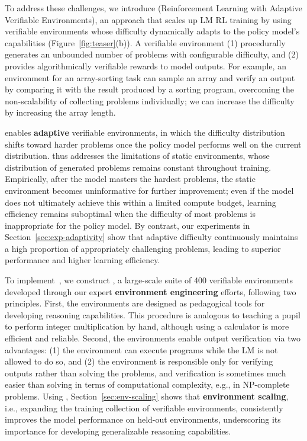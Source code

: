 \documentclass{article}
\theoremstyle{plain}
\theoremstyle{definition}
\theoremstyle{remark}
\begin{document}
To address these challenges, we introduce \textbf{\ours{}} (Reinforcement Learning with Adaptive Verifiable Environments), an approach that scales up LM RL training by using verifiable environments whose difficulty dynamically adapts to the policy model’s capabilities
(Figure~\ref{fig:teaser}(b)).
A verifiable environment (1) procedurally generates an unbounded number of problems with configurable difficulty, and (2) provides algorithmically verifiable rewards to model outputs.
For example, an environment for an array-sorting task can sample an array and verify an output by comparing it with the result produced by a sorting program, overcoming the non-scalability of collecting problems individually;
we can increase the difficulty by increasing the array length.

\ours{} enables \textbf{adaptive} verifiable environments, in which the difficulty distribution shifts toward harder problems once the policy model performs well on the current distribution.
\ours{} thus addresses the limitations of static environments, whose distribution of generated problems remains constant throughout training.
Empirically, after the model masters the hardest problems, the static environment becomes uninformative for further improvement;
even if the model does not ultimately achieve this within a limited compute budget, learning efficiency remains suboptimal when the difficulty of most problems is inappropriate for the policy model.
By contrast, our experiments in Section~\ref{sec:exp-adaptivity} show that adaptive difficulty continuously maintains a high proportion of appropriately challenging problems, leading to superior performance and higher learning efficiency.

To implement~\ours{}, we construct \textbf{\suite{}}, a large-scale suite of 400 verifiable environments developed through our expert \textbf{environment engineering} efforts, following two principles.
First, the environments are designed as pedagogical tools for developing reasoning capabilities.
This procedure is analogous to teaching a pupil to perform integer multiplication by hand, although using a calculator is more efficient and reliable.
Second, the environments enable output verification via two advantages:
(1) the environment can execute programs while the LM is not allowed to do so,
and (2) the environment is responsible only for verifying outputs rather than solving the problems, and verification is sometimes much easier than solving in terms of computational complexity, e.g., in NP-complete problems.
Using \suite{}, Section~\ref{sec:env-scaling} shows that \textbf{environment scaling}, i.e., expanding the training collection of verifiable environments, consistently improves the model performance on held-out environments, underscoring its importance for developing generalizable reasoning capabilities.
\end{document}
